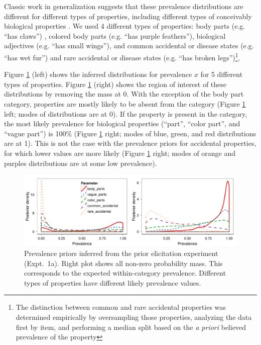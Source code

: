 \documentclass[10pt,letterpaper]{article}
\begin{document}
Classic work in generalization suggests that these prevalence distributions are different for different types of properties, including different types of conceivably biological properties \cite{Nisbett1983}. 
We used 4 different types of properties: body parts (e.g. ``has claws'') , colored body parts (e.g. ``has purple feathers''), biological adjectives (e.g. ``has small wings''), and common accidental or disease states (e.g. ``has wet fur'') and rare accidental or disease states (e.g. ``has broken legs'')\footnote{The distinction between common and rare accidental properties was determined empirically by oversampling those properties, analyzing the data first by item, and performing a median split based on the \emph{a priori} believed prevalence of the property}.

Figure \ref{fig:prior2} (left) shows the inferred distributions for prevalence $x$ for 5 different types of properties. 
Figure \ref{fig:prior2} (right) shows the region of interest of these distributions by removing the mass at 0. 
With the exception of the body part category, properties are mostly likely to be absent from the category (Figure \ref{fig:prior2} left; modes of distributions are at 0).
If the property is present in the category, the most likely prevalence for biological properties (``part'', ``color part'', and ``vague part'') is 100\% (Figure \ref{fig:prior2} right; modes of blue, green, and red distributions are at 1).
This is not the case with the prevalence priors for accidental properties, for which lower values are more likely (Figure \ref{fig:prior2} right; modes of orange and purples distributions are at some low prevalence).


\begin{figure}
\centering
    \includegraphics[width=\columnwidth]{prior2_prevalenceprior-50kx3.pdf}
    \caption{Prevalence priors inferred from the prior elicitation experiment  (Expt.~1a). Right plot shows all non-zero probability mass. This corresponds to the expected within-category prevalence. Different types of properties have different likely prevalence values.}
  \label{fig:prior2}
\end{figure}
\end{document}
